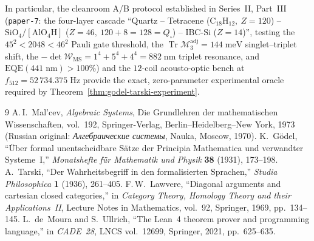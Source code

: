 \documentclass[11pt,a4paper]{article}
\theoremstyle{definition}
\theoremstyle{remark}
\begin{document}
In particular, the cleanroom A/B protocol established in Series~II, Part~III (\texttt{paper-7}: the four-layer cascade ``Quartz -- Tetracene ($\mathrm{C_{18}H_{12}},\ Z=120$) -- $\mathrm{SiO_4}/[\mathrm{AlO_4H}]$ ($Z=46,\ 120+8=128=Q_\square$) -- IBC-$\mathrm{Si}$ ($Z=14$)'', testing the $45^2 < 2048 < 46^2$ Pauli gate threshold, the $\operatorname{Tr}\mathcal{M}_3^{\mathrm{adj}} = 144\;\text{meV}$ singlet--triplet shift, the $-\det\mathcal{W}_{\mathrm{MS}} = 1^4+5^4+4^4 = 882\;\text{nm}$ triplet resonance, and $\mathrm{EQE}(441\;\text{nm}) > 100\%$) and the $12$-coil acousto-optic bench at $f_{512} = 52\,734.375\;\text{Hz}$ provide the exact, zero-parameter experimental oracle required by Theorem~\ref{thm:godel-tarski-experiment}.

\begin{thebibliography}{9}
A.\,I.~Mal'cev, \emph{Algebraic Systems}, Die Grundlehren der mathematischen Wissenschaften, vol.~192, Springer-Verlag, Berlin--Heidelberg--New York, 1973 (Russian original: \emph{Алгебраические системы}, Nauka, Moscow, 1970).
K.~G\"odel, ``\"Uber formal unentscheidbare S\"atze der Principia Mathematica und verwandter Systeme~I,'' \emph{Monatshefte f\"ur Mathematik und Physik} \textbf{38} (1931), 173--198.
A.~Tarski, ``Der Wahrheitsbegriff in den formalisierten Sprachen,'' \emph{Studia Philosophica} \textbf{1} (1936), 261--405.
F.\,W.~Lawvere, ``Diagonal arguments and cartesian closed categories,'' in \emph{Category Theory, Homology Theory and their Applications~II}, Lecture Notes in Mathematics, vol.~92, Springer, 1969, pp.~134--145.
L.~de~Moura and S.~Ullrich, ``The Lean~4 theorem prover and programming language,'' in \emph{CADE~28}, LNCS vol.~12699, Springer, 2021, pp.~625--635.
\end{thebibliography}
\end{document}
